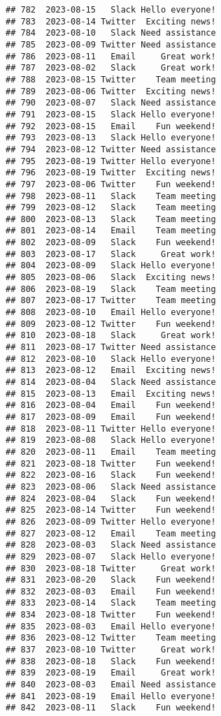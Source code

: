 \documentclass[
]{article}
\begin{document}
\begin{verbatim}
## 782  2023-08-15   Slack Hello everyone!
## 783  2023-08-14 Twitter  Exciting news!
## 784  2023-08-10   Slack Need assistance
## 785  2023-08-09 Twitter Need assistance
## 786  2023-08-11   Email     Great work!
## 787  2023-08-02   Slack     Great work!
## 788  2023-08-15 Twitter    Team meeting
## 789  2023-08-06 Twitter  Exciting news!
## 790  2023-08-07   Slack Need assistance
## 791  2023-08-15   Slack Hello everyone!
## 792  2023-08-15   Email    Fun weekend!
## 793  2023-08-13   Slack Hello everyone!
## 794  2023-08-12 Twitter Need assistance
## 795  2023-08-19 Twitter Hello everyone!
## 796  2023-08-19 Twitter  Exciting news!
## 797  2023-08-06 Twitter    Fun weekend!
## 798  2023-08-11   Slack    Team meeting
## 799  2023-08-12   Slack    Team meeting
## 800  2023-08-13   Slack    Team meeting
## 801  2023-08-14   Email    Team meeting
## 802  2023-08-09   Slack    Fun weekend!
## 803  2023-08-17   Slack     Great work!
## 804  2023-08-09   Slack Hello everyone!
## 805  2023-08-06   Slack  Exciting news!
## 806  2023-08-19   Slack    Team meeting
## 807  2023-08-17 Twitter    Team meeting
## 808  2023-08-10   Email Hello everyone!
## 809  2023-08-12 Twitter    Fun weekend!
## 810  2023-08-18   Slack     Great work!
## 811  2023-08-17 Twitter Need assistance
## 812  2023-08-10   Slack Hello everyone!
## 813  2023-08-12   Email  Exciting news!
## 814  2023-08-04   Slack Need assistance
## 815  2023-08-13   Email  Exciting news!
## 816  2023-08-04   Email    Fun weekend!
## 817  2023-08-09   Email    Fun weekend!
## 818  2023-08-11 Twitter Hello everyone!
## 819  2023-08-08   Slack Hello everyone!
## 820  2023-08-11   Email    Team meeting
## 821  2023-08-18 Twitter    Fun weekend!
## 822  2023-08-16   Slack    Fun weekend!
## 823  2023-08-06   Slack Need assistance
## 824  2023-08-04   Slack    Fun weekend!
## 825  2023-08-14 Twitter    Fun weekend!
## 826  2023-08-09 Twitter Hello everyone!
## 827  2023-08-12   Email    Team meeting
## 828  2023-08-03   Slack Need assistance
## 829  2023-08-07   Slack Hello everyone!
## 830  2023-08-18 Twitter     Great work!
## 831  2023-08-20   Slack    Fun weekend!
## 832  2023-08-03   Email    Fun weekend!
## 833  2023-08-14   Slack    Team meeting
## 834  2023-08-18 Twitter    Fun weekend!
## 835  2023-08-03   Email Hello everyone!
## 836  2023-08-12 Twitter    Team meeting
## 837  2023-08-10 Twitter     Great work!
## 838  2023-08-18   Slack    Fun weekend!
## 839  2023-08-19   Email     Great work!
## 840  2023-08-03   Email Need assistance
## 841  2023-08-19   Email Hello everyone!
## 842  2023-08-11   Slack    Fun weekend!

\end{verbatim}
\end{document}
